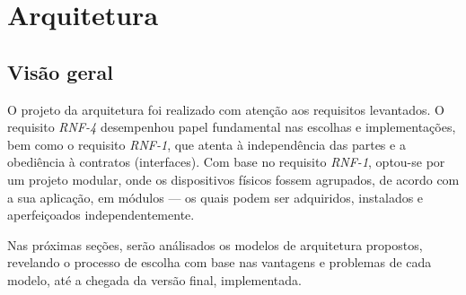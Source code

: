 \chapter{Arquitetura}

\section{Visão geral}

O projeto da arquitetura foi realizado com atenção aos requisitos levantados. O requisito \emph{RNF-4} desempenhou papel fundamental nas escolhas e implementações, bem como o requisito \emph{RNF-1}, que atenta à independência das partes e a obediência à contratos (interfaces). Com base no requisito \emph{RNF-1}, optou-se por um projeto modular, onde os dispositivos físicos fossem agrupados, de acordo com a sua aplicação, em módulos --- os quais podem ser adquiridos, instalados e aperfeiçoados independentemente.

Nas próximas seções, serão análisados os modelos de arquitetura propostos, revelando o processo de escolha com base nas vantagens e problemas de cada modelo, até a chegada da versão final, implementada. 












